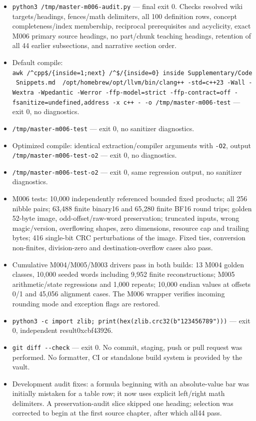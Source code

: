 \begin{itemize}
\tightlist
\item
  \texttt{python3\ /tmp/master-m006-audit.py} --- final exit 0. Checks resolved wiki targets/headings, fences/math delimiters, all 100 definition rows, concept completeness/index membership, reciprocal prerequisites and acyclicity, exact M006 primary source headings, no part/chunk teaching headings, retention of all 44 earlier subsections, and narrative section order.
\item
  Default compile: \texttt{awk\ \textquotesingle{}/\^{}\textasciigrave{}\textasciigrave{}\textasciigrave{}cpp\$/\{inside=1;next\}\ /\^{}\textasciigrave{}\textasciigrave{}\textasciigrave{}\$/\{inside=0\}\ inside\textquotesingle{}\ \textquotesingle{}Supplementary/Code\ Snippets.md\textquotesingle{}\ \textbar{}\ /opt/homebrew/opt/llvm/bin/clang++\ -std=c++23\ -Wall\ -Wextra\ -Wpedantic\ -Werror\ -ffp-model=strict\ -ffp-contract=off\ -fsanitize=undefined,address\ -x\ c++\ -\ -o\ /tmp/master-m006-test} --- exit 0, no diagnostics.
\item
  \texttt{/tmp/master-m006-test} --- exit 0, no sanitizer diagnostics.
\item
  Optimized compile: identical extraction/compiler arguments with \texttt{-O2}, output \texttt{/tmp/master-m006-test-o2} --- exit 0, no diagnostics.
\item
  \texttt{/tmp/master-m006-test-o2} --- exit 0, same regression output, no sanitizer diagnostics.
\item
  M006 tests: 10,000 independently referenced bounded fixed products; all 256 nibble pairs; 63,488 finite binary16 and 65,280 finite BF16 round trips; golden 52-byte image, odd-offset/raw-word preservation; truncated inputs, wrong magic/version, overflowing shapes, zero dimensions, resource cap and trailing bytes; 416 single-bit CRC perturbations of the image. Fixed ties, conversion non-finites, division-zero and destination-overflow cases also pass.
\item
  Cumulative M004/M005/M003 drivers pass in both builds: 13 M004 golden classes, 10,000 seeded words including 9,952 finite reconstructions; M005 arithmetic/state regressions and 1,000 repeats; 10,000 endian values at offsets 0/1 and 45,056 alignment cases. The M006 wrapper verifies incoming rounding mode and exception flags are restored.
\item
  \texttt{python3\ -c\ \textquotesingle{}import\ zlib;\ print(hex(zlib.crc32(b"123456789")))\textquotesingle{}} --- exit 0, independent result0xcbf43926.
\item
  \texttt{git\ diff\ -\/-check} --- exit 0. No commit, staging, push or pull request was performed. No formatter, CI or standalone build system is provided by the vault.
\item
  Development audit fixes: a formula beginning with an absolute-value bar was initially mistaken for a table row; it now uses explicit left/right math delimiters. A preservation-audit slice skipped one heading; selection was corrected to begin at the first source chapter, after which all44 pass.
\end{itemize}

